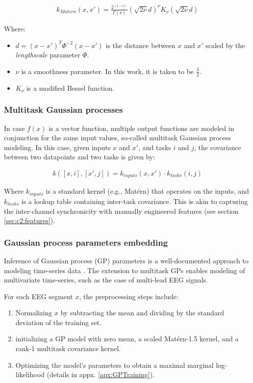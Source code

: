 \begin{align}
    k_{Matern}(x,x') = \frac{2^{(1-\nu)}}{\Gamma(\nu)}(\sqrt{2\nu}d)^\nu K_\nu (\sqrt{2\nu}d)
\end{align}

Where:
\begin{itemize}
    \item $d = (x-x')^T \Phi^{-2} (x - x')$ is the distance between $x$ and $x'$ scaled by the \emph{lengthscale} parameter $\Phi$.
    \item $\nu$ is a smoothness parameter. In this work, it is taken to be $\frac{3}{2}$.
    \item $K_\nu$ is a modified Bessel function.
\end{itemize}

\subsubsection{Multitask Gaussian processes}
In case $f(x)$ is a vector function, multiple output functions are modeled in conjunction for the same input values, so-called multitask Gaussian process modeling. In this case, given inputs $x$ and $x'$, and tasks $i$ and $j$, the covariance between two datapoints and two tasks is given by:

\begin{align}
\label{eq:2background:multitask}
    k([x,i], [x',j]) = k_{inputs}(x,x') \cdot k_{tasks}(i,j)
\end{align}

Where $k_{inputs}$ is a standard kernel (e.g., Matérn) that operates on the inputs, and $k_{tasks}$ is a lookup table containing inter-task covariance. This is akin to capturing the inter-channel synchronicity with manually engineered features (see section \ref{sec:c2:features}).


\subsubsection{Gaussian process parameters embedding}
Inference of Gaussian process (GP) parameters is a well-documented approach to modeling time-series data \cite{rasmussen2003gaussian}. The extension to multitask GPs enables modeling of multivariate time-series, such as the case of multi-lead EEG signals.

% 

For each EEG segment $x$, the preprocessing steps include:

\begin{enumerate}[label=\roman*]
    \item Normalizing $x$ by subtracting the mean and dividing by the standard deviation of the training set.
    \item initializing a GP model with zero mean, a scaled Matérn-1.5 kernel, and a rank-1 multitask covariance kernel.
    \item Optimizing the model's parameters to obtain a maximal marginal log-likelihood (details in appx. \ref{apx:GPTraining}).
\end{enumerate}

